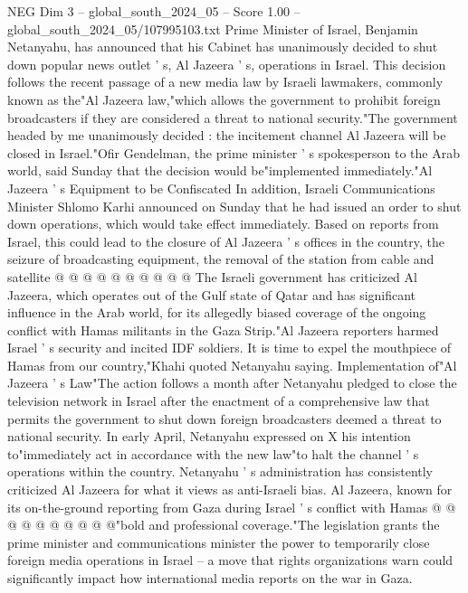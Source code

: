 \begin{textsample}{NEG Dim 3 – global\_south\_2024\_05 – Score 1.00 – global\_south\_2024\_05/107995103.txt}  \label{ex:f3_neg_357}
Prime Minister of Israel, Benjamin Netanyahu, has announced that his Cabinet has unanimously decided to shut down popular news outlet ' s, Al Jazeera ' s, operations in Israel.
This decision follows the recent passage of a new media law by Israeli lawmakers, commonly known as the"Al Jazeera law,"which allows the government to prohibit foreign broadcasters if they are considered a threat to national security."The government headed by me unanimously decided : the incitement channel Al Jazeera will be closed in Israel."Ofir Gendelman, the prime minister ' s spokesperson to the Arab world, said Sunday that the decision would be"implemented immediately."Al Jazeera ' s Equipment to be Confiscated In addition, Israeli Communications Minister Shlomo Karhi announced on Sunday that he had issued an order to shut down operations, which would take effect immediately.
Based on reports from Israel, this could lead to the closure of Al Jazeera ' s offices in the country, the seizure of broadcasting equipment, the removal of the station from cable and satellite @ @ @ @ @ @ @ @ @ @ The Israeli government has criticized Al Jazeera, which operates out of the Gulf state of Qatar and has significant influence in the Arab world, for its allegedly biased coverage of the ongoing conflict with Hamas militants in the Gaza Strip."Al Jazeera reporters harmed Israel ' s security and incited IDF soldiers.
It is time to expel the mouthpiece of Hamas from our country,"Khahi quoted Netanyahu saying.
Implementation of"Al Jazeera ' s Law"The action follows a month after Netanyahu pledged to close the television network in Israel after the enactment of a comprehensive law that permits the government to shut down foreign broadcasters deemed a threat to national security.
In early April, Netanyahu expressed on X his intention to"immediately act in accordance with the new law"to halt the channel ' s operations within the country.
Netanyahu ' s administration has consistently criticized Al Jazeera for what it views as anti-Israeli bias.
Al Jazeera, known for its on-the-ground reporting from Gaza during Israel ' s conflict with Hamas @ @ @ @ @ @ @ @ @ @"bold and professional coverage."The legislation grants the prime minister and communications minister the power to temporarily close foreign media operations in Israel -- a move that rights organizations warn could significantly impact how international media reports on the war in Gaza.

\end{textsample}
